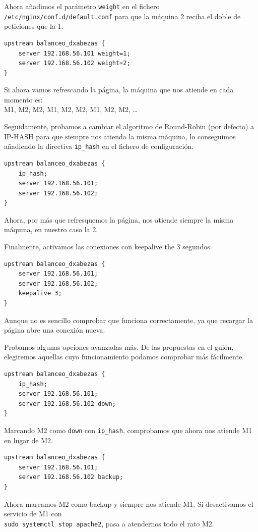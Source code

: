 \documentclass{article}
\begin{document}
Ahora añadimos el parámetro \texttt{weight} en el fichero \texttt{/etc/nginx/conf.d/default.conf} para que la máquina 2 reciba
el doble de peticiones que la 1.

\begin{Verbatim}[tabsize=4]
upstream balanceo_dxabezas {
	server 192.168.56.101 weight=1;
	server 192.168.56.102 weight=2;
}
\end{Verbatim}
Si ahora vamos refrescando la página, la máquina que nos atiende en cada momento es: \\
M1, M2, M2, M1, M2, M2, M1, M2, M2, \ldots

Seguidamente, probamos a cambiar el algoritmo de Round-Robin (por defecto) a IP-HASH para que siempre nos atienda la misma máquina,
lo conseguimos añadiendo la directiva \texttt{ip\_hash} en el fichero de configuración.
\begin{Verbatim}[tabsize=4]
upstream balanceo_dxabezas {
	ip_hash;
	server 192.168.56.101;
	server 192.168.56.102;
}
\end{Verbatim}
Ahora, por más que refresquemos la página, nos atiende siempre la misma máquina, en nuestro caso la 2. 

Finalmente, activamos las conexiones con keepalive the 3 segundos.
\begin{Verbatim}[tabsize=4]
upstream balanceo_dxabezas {
	server 192.168.56.101;
	server 192.168.56.102;
	keepalive 3;
}
\end{Verbatim}
Aunque no es sencillo comprobar que funciona correctamente, ya que recargar la página abre una conexión nueva.

Probamos algunas opciones avanzadas más. De las propuestas en el guión, elegiremos aquellas cuyo
funcionamiento podamos comprobar más fácilmente.

\begin{Verbatim}[tabsize=4]
upstream balanceo_dxabezas {
	ip_hash;
	server 192.168.56.101;
	server 192.168.56.102 down;
}
\end{Verbatim}
Marcando M2 como \texttt{down} con \texttt{ip\_hash}, comprobamos que ahora nos atiende M1 en lugar de M2.

\begin{Verbatim}[tabsize=4]
upstream balanceo_dxabezas {
	server 192.168.56.101;
	server 192.168.56.102 backup;
}
\end{Verbatim}
Ahora marcamos M2 como backup y siempre nos atiende M1. Si desactivamos el servicio de M1 con \\
\verb^sudo systemctl stop apache2^, pasa a atendernos todo el rato M2.
\end{document}
